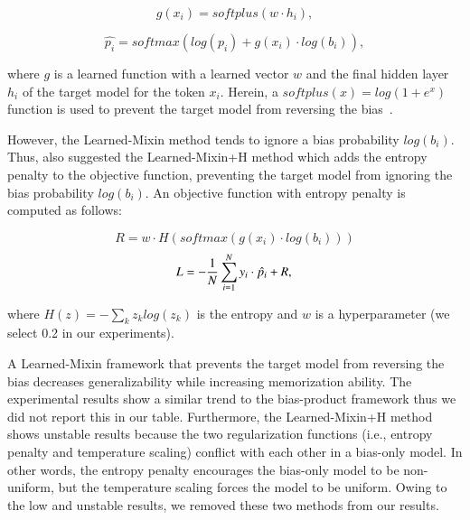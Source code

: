 \documentclass[11pt]{article}
\begin{document}
\begin{equation}
    g(x_i) = softplus(w \cdot h_i),
\end{equation}

\begin{equation}
    \hat{p_{i}} = softmax(log(p_i) + g(x_i) \cdot log(b_i)),
\end{equation}

where $g$ is a learned function with a learned vector $w$ and the final hidden layer $h_i$ of the target model for the token $x_i$. 
Herein, a $softplus(x) = log(1+e^x)$ function is used to prevent the target model from reversing the bias~\cite{clark2019don}.

However, the Learned-Mixin method tends to ignore a bias probability $log(b_i)$.
Thus, \cite{clark2019don} also suggested the Learned-Mixin+H method which adds the entropy penalty to the objective function, preventing the target model from ignoring the bias probability $log(b_i)$.
An objective function with entropy penalty is computed as follows:

\begin{equation}
    R = w \cdot H(softmax(g(x_i) \cdot log(b_i)))
\end{equation}
\begin{equation}
    L = -\frac{1}{N}\sum_{i=1}^{N} y_{i} \cdot \hat{p_{i}} + R, \\
\end{equation}

where $H(z) = -\sum_kz_klog(z_k)$ is the entropy and $w$ is a hyperparameter (we select 0.2 in our experiments). 

A Learned-Mixin framework that prevents the target model from reversing the bias decreases generalizability while increasing memorization ability.
The experimental results show a similar trend to the bias-product framework thus we did not report this in our table.
Furthermore, the Learned-Mixin+H method shows unstable results because the two regularization functions (i.e., entropy penalty and temperature scaling) conflict with each other in a bias-only model.
In other words, the entropy penalty encourages the bias-only model to be non-uniform, but the temperature scaling forces the model to be uniform.
Owing to the low and unstable results, we removed these two methods from our results.
\end{document}
